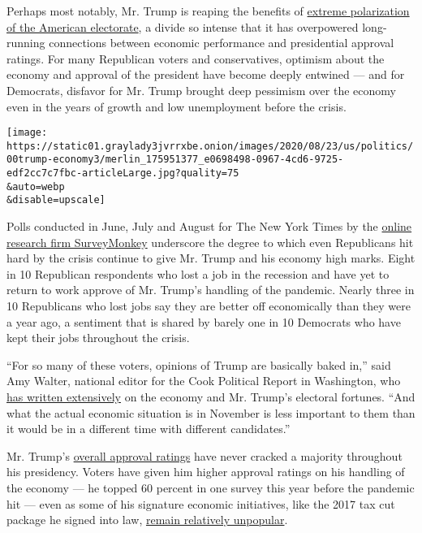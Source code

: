 Perhaps most notably, Mr. Trump is reaping the benefits of
\href{https://www.nytimes3xbfgragh.onion/2019/10/29/business/economy/survey-politics-economy.html}{extreme
polarization of the American electorate}, a divide so intense that it
has overpowered long-running connections between economic performance
and presidential approval ratings. For many Republican voters and
conservatives, optimism about the economy and approval of the president
have become deeply entwined --- and for Democrats, disfavor for Mr.
Trump brought deep pessimism over the economy even in the years of
growth and low unemployment before the crisis.

\texttt{[image: https://static01.graylady3jvrrxbe.onion/images/2020/08/23/us/politics/00trump-economy3/merlin\_175951377\_e0698498-0967-4cd6-9725-edf2cc7c7fbc-articleLarge.jpg?quality=75\\\&auto=webp\\\&disable=upscale]}

Polls conducted in June, July and August for The New York Times by the
\href{https://www.surveymonkey.com/curiosity/nyt-august-2020-cci/}{online
research firm SurveyMonkey} underscore the degree to which even
Republicans hit hard by the crisis continue to give Mr. Trump and his
economy high marks. Eight in 10 Republican respondents who lost a job in
the recession and have yet to return to work approve of Mr. Trump's
handling of the pandemic. Nearly three in 10 Republicans who lost jobs
say they are better off economically than they were a year ago, a
sentiment that is shared by barely one in 10 Democrats who have kept
their jobs throughout the crisis.

``For so many of these voters, opinions of Trump are basically baked
in,'' said Amy Walter, national editor for the Cook Political Report in
Washington, who
\href{https://cookpolitical.com/analysis/national/national-politics/can-biden-undercut-trumps-continued-advantage-economy}{has
written extensively} on the economy and Mr. Trump's electoral fortunes.
``And what the actual economic situation is in November is less
important to them than it would be in a different time with different
candidates.''

Mr. Trump's
\href{https://projects.fivethirtyeight.com/trump-approval-ratings/}{overall
approval ratings} have never cracked a majority throughout his
presidency. Voters have given him higher approval ratings on his
handling of the economy --- he topped 60 percent in one survey this year
before the pandemic hit --- even as some of his signature economic
initiatives, like the 2017 tax cut package he signed into law,
\href{https://news.gallup.com/opinion/polling-matters/249161/public-opinion-2017-tax-law.aspx}{remain
relatively unpopular}.


